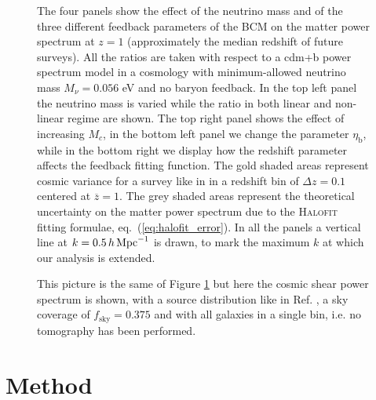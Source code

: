 \documentclass[a4paper,11pt]{article}
\def\kMpc{\, h \, {\rm Mpc}^{-1}}
\newcommand{\eq}[1]{eq.~(\ref{#1})}
\begin{document}
{\begin{figure}[!t]
\caption{The four panels show the effect of the neutrino mass and of the three different feedback parameters of the BCM on the matter power spectrum at $z=1$ (approximately the median redshift of future surveys). All the ratios are taken with respect to a cdm+b power spectrum model in a cosmology with minimum-allowed neutrino mass $M_\nu = 0.056$ eV and no baryon feedback. In the top left panel the neutrino mass is varied while the ratio in both linear and non-linear regime are shown. The top right panel shows the effect of increasing $M_c$, in the bottom left panel we change the parameter $\eta_\mathrm b$, while in the bottom right we display how the redshift parameter affects the feedback fitting function. The gold shaded areas represent cosmic variance for a survey like in \cite{Audren+12} in a redshift bin of $\Delta z = 0.1$ centered at $\overline z=1$. The grey shaded areas represent the theoretical uncertainty on the matter power spectrum due to the \textsc{Halofit} fitting formulae, \eq{eq:halofit_error}. In all the panels a vertical line at $k = 0.5 \kMpc$ is drawn, to mark the maximum $k$ at which our analysis is extended.}
 \label{fig:Pk_nu_feed}
\end{figure}

\begin{figure}[!t]
\caption{This picture is the same of Figure \ref{fig:Pk_nu_feed} but here the cosmic shear power spectrum is shown, with a source distribution like in Ref. \cite{Audren+12}, a sky coverage of $f_\textrm{sky} = 0.375$ and with all galaxies in a single bin, i.e. no tomography has been performed.}
 \label{fig:Cl_nu_feed}
\end{figure}


\section{Method}
\label{sec:method}

}
\end{document}
